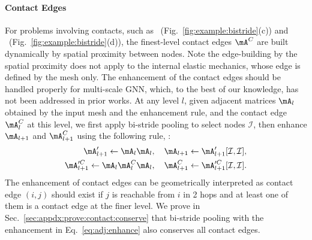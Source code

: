 \paragraph*{Contact Edges}
For problems involving contacts, such as \plate~(Fig.~\ref{fig:example:bistride}(c)) and \fonts~(Fig.~\ref{fig:example:bistride}(d)), the finest-level contact edges $\mA^C$ are built dynamically by spatial proximity between nodes. Note the edge-building by the spatial proximity does not apply to the internal elastic mechanics, whose edge is defined by the mesh only. The enhancement of the contact edges should be handled properly for multi-scale GNN, which, to the best of our knowledge, has not been addressed in prior works. At any level $l$, given adjacent matrices $\mA_l$ obtained by the input mesh and the enhancement rule, and the contact edge $\mA^C_l$ at this level, we first apply bi-stride pooling to select nodes $\mathcal{I}$, then enhance $\mA_{l+1}$ and $\mA^C_{l+1}$ using the following rule, :
\begin{equation}
    \label{eq:adj:enhance}
    \begin{split}
        \mA'_{l+1} \leftarrow \mA_l \mA_l, \quad \mA_{l+1} & \leftarrow \mA'_{l+1}[\mathcal{I},\mathcal{I}],\\
        \mA'^C_{l+1} \leftarrow \mA_l \mA^C_l \mA_l , \quad \mA^C_{l+1} & \leftarrow \mA'^C_{l+1}[\mathcal{I},\mathcal{I}].
    \end{split}
\end{equation}
The enhancement of contact edges can be geometrically interpreted as contact edge $(i,j)$ should exist if $j$ is reachable from $i$ in 2 hops and at least one of them is a contact edge at the finer level. We prove in Sec.~\ref{sec:appdx:prove:contact:conserve} that bi-stride pooling with the enhancement in Eq.~\ref{eq:adj:enhance} also conserves all contact edges.
